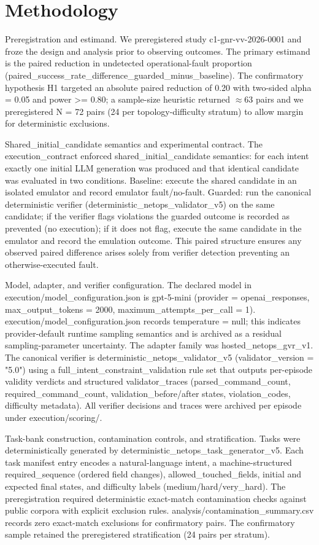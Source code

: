\documentclass[conference]{IEEEtran}
\begin{document}
\section{Methodology}
Preregistration and estimand. We preregistered study c1-gnr-vv-2026-0001 and froze the design and analysis prior to observing outcomes. The primary estimand is the paired reduction in undetected operational-fault proportion (paired\_success\_rate\_difference\_guarded\_minus\_baseline). The confirmatory hypothesis H1 targeted an absolute paired reduction of 0.20 with two-sided alpha = 0.05 and power >= 0.80; a sample-size heuristic returned \ensuremath{\approx}63 pairs and we preregistered N = 72 pairs (24 per topology-difficulty stratum) to allow margin for deterministic exclusions.

Shared\_initial\_candidate semantics and experimental contract. The execution\_contract enforced shared\_initial\_candidate semantics: for each intent exactly one initial LLM generation was produced and that identical candidate was evaluated in two conditions. Baseline: execute the shared candidate in an isolated emulator and record emulator fault/no-fault. Guarded: run the canonical deterministic verifier (deterministic\_netops\_validator\_v5) on the same candidate; if the verifier flags violations the guarded outcome is recorded as prevented (no execution); if it does not flag, execute the same candidate in the emulator and record the emulation outcome. This paired structure ensures any observed paired difference arises solely from verifier detection preventing an otherwise-executed fault.

Model, adapter, and verifier configuration. The declared model in execution/model\_configuration.json is gpt-5-mini (provider = openai\_responses, max\_output\_tokens = 2000, maximum\_attempts\_per\_call = 1). execution/model\_configuration.json records temperature = null; this indicates provider-default runtime sampling semantics and is archived as a residual sampling-parameter uncertainty. The adapter family was hosted\_netops\_gvr\_v1. The canonical verifier is deterministic\_netops\_validator\_v5 (validator\_version = "5.0") using a full\_intent\_constraint\_validation rule set that outputs per-episode validity verdicts and structured validator\_traces (parsed\_command\_count, required\_command\_count, validation\_before/after states, violation\_codes, difficulty metadata). All verifier decisions and traces were archived per episode under execution/scoring/.

Task-bank construction, contamination controls, and stratification. Tasks were deterministically generated by deterministic\_netops\_task\_generator\_v5. Each task manifest entry encodes a natural-language intent, a machine-structured required\_sequence (ordered field changes), allowed\_touched\_fields, initial and expected final states, and difficulty labels (medium/hard/very\_hard). The preregistration required deterministic exact-match contamination checks against public corpora with explicit exclusion rules. analysis/contamination\_summary.csv records zero exact-match exclusions for confirmatory pairs. The confirmatory sample retained the preregistered stratification (24 pairs per stratum).
\end{document}
